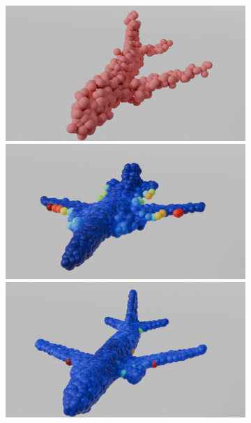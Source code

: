         \begin{figure}[htb]
          \centering
          \begin{subfigure}[t]{\textwidth+20pt\relax}
            \includegraphics[width=\dimexpr\linewidth-20pt\relax]{figures/part_ap1.png}
            \includegraphics[width=\dimexpr\linewidth-20pt\relax]{figures/dc_lin_ap1.png}
            \includegraphics[width=\dimexpr\linewidth-20pt\relax]{figures/do_lin_ap1.png}

\end{subfigure}
\end{figure}

